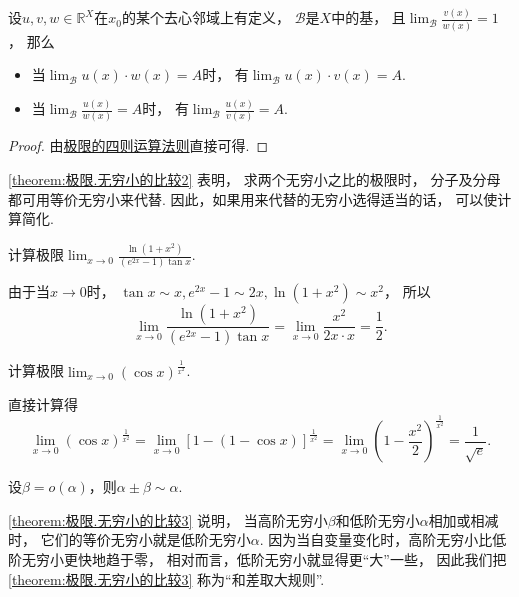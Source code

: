 \begin{theorem}\label{theorem:极限.无穷小的比较2}
设\(u,v,w\in\mathbb{R}^X\)在\(x_0\)的某个去心邻域上有定义，
\(\mathcal{B}\)是\(X\)中的基，
且\(\lim_\mathcal{B} \frac{v(x)}{w(x)} = 1\)，
那么\begin{itemize}
	\item 当\(\lim_\mathcal{B} u(x) \cdot w(x) = A\)时，
	有\(\lim_\mathcal{B} u(x) \cdot v(x) = A\).

	\item 当\(\lim_\mathcal{B} \frac{u(x)}{w(x)} = A\)时，
	有\(\lim_\mathcal{B} \frac{u(x)}{v(x)} = A\).
\end{itemize}
\begin{proof}
由\hyperref[theorem:极限.极限的四则运算法则]{极限的四则运算法则}直接可得.
\end{proof}
\end{theorem}

\cref{theorem:极限.无穷小的比较2} 表明，
求两个无穷小之比的极限时，
分子及分母都可用等价无穷小来代替.
因此，如果用来代替的无穷小选得适当的话，
可以使计算简化.

\begin{example}
计算极限\(\lim_{x\to0} \frac{\ln(1+x^2)}{(e^{2x}-1) \tan x}\).
\begin{solution}
由于当\(x\to0\)时，
\(\tan x \sim x,
e^{2x}-1 \sim 2x,
\ln(1+x^2) \sim x^2\)，
所以\[
	\lim_{x\to0} \frac{\ln(1+x^2)}{(e^{2x}-1) \tan x}
	= \lim_{x\to0} \frac{x^2}{2x \cdot x}
	= \frac12.
\]
\end{solution}
\end{example}

\begin{example}
计算极限\(\lim_{x\to0} (\cos x)^{\frac1{x^2}}\).
\begin{solution}
直接计算得\[
	\lim_{x\to0} (\cos x)^{\frac1{x^2}}
	= \lim_{x\to0} [1-(1-\cos x)]^{\frac1{x^2}}
	= \lim_{x\to0} \left(1-\frac{x^2}2\right)^{\frac1{x^2}}
	= \frac1{\sqrt{e}}.
\]
\end{solution}
\end{example}

\begin{proposition}[和差取大规则]\label{theorem:极限.无穷小的比较3}
设\(\beta=o(\alpha)\)，则\(\alpha\pm\beta\sim\alpha\).
\end{proposition}
\cref{theorem:极限.无穷小的比较3} 说明，
当高阶无穷小\(\beta\)和低阶无穷小\(\alpha\)相加或相减时，
它们的等价无穷小就是低阶无穷小\(\alpha\).
因为当自变量变化时，高阶无穷小比低阶无穷小更快地趋于零，
相对而言，低阶无穷小就显得更“大”一些，
因此我们把\cref{theorem:极限.无穷小的比较3} 称为“和差取大规则”.

